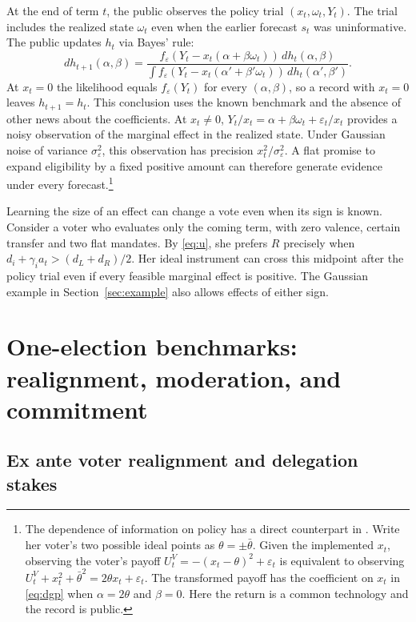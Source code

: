\documentclass[11pt,letterpaper]{article}
\begin{document}
At the end of term $t$, the public observes the policy trial $(x_t,\omega_t,Y_t)$. The trial includes the realized state $\omega_t$ even when the earlier forecast $s_t$ was uninformative. The public updates $h_t$ via Bayes' rule:
\begin{equation}
 dh_{t+1}(\alpha,\beta)=
 \frac{f_\varepsilon(Y_t-x_t(\alpha+\beta\omega_t))\,dh_t(\alpha,\beta)}
 {\int f_\varepsilon(Y_t-x_t(\alpha'+\beta'\omega_t))\,dh_t(\alpha',\beta')} .
 \label{eq:bayes}
\end{equation}
At $x_t=0$ the likelihood equals $f_\varepsilon(Y_t)$ for every $(\alpha,\beta)$, so a record with $x_t=0$ leaves $h_{t+1}=h_t$. This conclusion uses the known benchmark and the absence of other news about the coefficients. At $x_t\ne0$, $Y_t/x_t=\alpha+\beta\omega_t+\varepsilon_t/x_t$ provides a noisy observation of the marginal effect in the realized state. Under Gaussian noise of variance $\sigma_\varepsilon^2$, this observation has precision $x_t^2/\sigma_\varepsilon^2$. A flat promise to expand eligibility by a fixed positive amount can therefore generate evidence under every forecast.\footnote{The dependence of information on policy has a direct counterpart in \citet[eq.~1]{izzofuture}. Write her voter's two possible ideal points as $\theta=\pm\bar\theta$. Given the implemented $x_t$, observing the voter's payoff $U_t^V=-(x_t-\theta)^2+\varepsilon_t$ is equivalent to observing $U_t^V+x_t^2+\bar\theta^2=2\theta x_t+\varepsilon_t$. The transformed payoff has the coefficient on $x_t$ in \eqref{eq:dgp} when $\alpha=2\theta$ and $\beta=0$. Here the return is a common technology and the record is public.}

Learning the size of an effect can change a vote even when its sign is known. Consider a voter who evaluates only the coming term, with zero valence, certain transfer and two flat mandates. By \eqref{eq:u}, she prefers $R$ precisely when $d_i+\gamma_i a_t>(d_L+d_R)/2$. Her ideal instrument can cross this midpoint after the policy trial even if every feasible marginal effect is positive. The Gaussian example in Section~\ref{sec:example} also allows effects of either sign.

\section{One-election benchmarks: realignment, moderation, and commitment}\label{sec:prelim}

\subsection{Ex ante voter realignment and delegation stakes}
\end{document}
